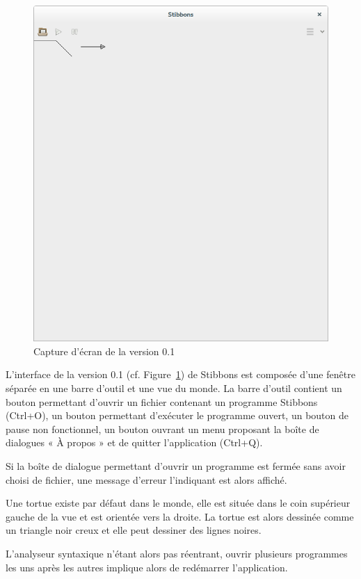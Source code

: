 \begin{figure}[h]
\includegraphics[scale=0.25]{doc/report/screenshot/stibbons-0-1-2.png}
\caption{\label{screenshot-0.1} Capture d'écran de la version 0.1}
\end{figure}

L'interface de la version 0.1 (cf. Figure~\ref{screenshot-0.1}) de Stibbons est composée d'une fenêtre séparée en une barre d'outil et une vue du monde.
La barre d'outil contient un bouton permettant d'ouvrir un fichier contenant un programme Stibbons (Ctrl+O), un bouton permettant d'exécuter le programme ouvert, un bouton de pause non fonctionnel, un bouton ouvrant un menu proposant la boîte de dialogues « À propos » et de quitter l'application (Ctrl+Q).

Si la boîte de dialogue permettant d'ouvrir un programme est fermée sans avoir choisi de fichier, une message d'erreur l'indiquant est alors affiché.

Une tortue existe par défaut dans le monde, elle est située dans le coin supérieur gauche de la vue et est orientée vers la droite. La tortue est alors dessinée comme un triangle noir creux et elle peut dessiner des lignes noires.

L'analyseur syntaxique n'étant alors pas réentrant, ouvrir plusieurs programmes les uns après les autres implique alors de redémarrer l'application.

